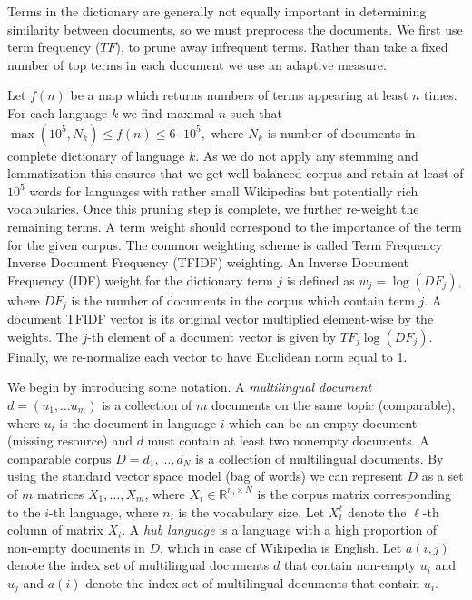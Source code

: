 \documentclass[twoside,11pt]{article}
\newcommand{\RR}{\mathbb{R}}
\begin{document}
Terms in the dictionary are generally not equally important in determining similarity between documents, so we must preprocess the documents. We first use term frequency ($TF$), to prune away infrequent terms. Rather than take a fixed number of top terms in each document we use an adaptive measure.

Let $f(n)$ be a map which returns numbers of terms appearing at least $n$ times.  For each language $k$ we find maximal $n$ such that $\max(10^5, N_k)\leq f(n) \leq 6\cdot 10^5,$ where $N_k$ is number of documents in complete dictionary of language $k.$ As we do not apply any stemming and lemmatization this ensures that we get well balanced corpus and retain at least of $10^5$ words for languages with rather small Wikipedias but potentially rich vocabularies. Once this pruning step is complete, we further re-weight the remaining terms. A term weight should correspond to the importance of the term for the given corpus.  The common weighting scheme is called Term Frequency Inverse Document Frequency (TFIDF) weighting. An Inverse Document Frequency (IDF) weight for the dictionary term $j$ is defined as $w_j = \log( DF_j )$, where $DF_j$ is the number of documents in the corpus which contain term $j$.  A document TFIDF vector is its original vector multiplied element-wise by the weights. The $j$-th element of a document vector is given by $ TF_j \log( DF_j )$. Finally, we re-normalize each vector to have Euclidean norm equal to 1.

We begin by introducing some notation. A \emph{multilingual document} $d = (u_1,\ldots u_m)$ is a collection of $m$ documents on the same topic (comparable), where $u_i$ is the document in language $i$ which can be an empty document (missing resource) and $d$ must contain at least two nonempty documents. A comparable corpus $D = {d_1, \ldots, d_N}$ is a collection of multilingual documents. By using the standard vector space model (bag of words) we can represent $D$ as a set of $m$ matrices $X_1,\ldots,X_m$, where $X_i \in \RR^{n_i \times N}$ is the corpus matrix corresponding to the $i$-th language, where $n_i$ is the vocabulary size. Let $X_i^{\ell}$ denote the $\ell$-th column of matrix $X_i$. A \emph{hub language} is a language with a high proportion of non-empty documents in $D$, which in case of Wikipedia is English. Let $a(i,j)$ denote the index set of multilingual documents $d$ that contain non-empty $u_i$ and $u_j$ and $a(i)$ denote the index set of multilingual documents that contain $u_i$.
\end{document}
